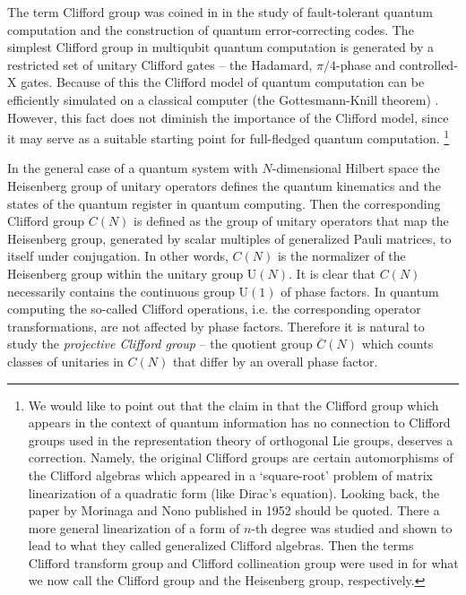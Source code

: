 \documentclass[10pt]{amsart}
\theoremstyle{plain}
\theoremstyle{definition}
\theoremstyle{remark}%
\newcommand{\U}{\mathrm{U}}
\begin{document}
The term Clifford group was coined in \cite{Gottesman} in the study 
of fault-tolerant quantum computation and the construction 
of quantum error-correcting codes. 
The simplest Clifford group in multiqubit quantum computation is generated 
by a restricted set of unitary Clifford gates -- 
the Hadamard, $\pi/4$-phase and controlled-X gates. 
Because of this the Clifford model of quantum computation 
can be efficiently simulated on a classical computer 
(the Gottesmann-Knill theorem) \cite{NielsenChuang}.
However, this fact does not diminish the importance of the Clifford
model, since it may serve as a suitable starting point for 
full-fledged quantum computation.
\footnote{We would like to point out that the claim in 
	\cite[note 43]{Gross} that the Clifford group 
which appears in the context of quantum information has no connection to 
Clifford groups used in the representation theory of orthogonal Lie groups, 
deserves a correction. Namely, the original Clifford
groups are certain automorphisms of the Clifford algebras
which appeared in a `square-root' problem of matrix linearization 
of a quadratic form  (like Dirac's equation). 
Looking back, the paper by Morinaga and Nono published in 1952
\cite{MorinagaNono} should be quoted.
There a more general linearization of a form of $n$-th degree was 
studied and shown to lead to what they called generalized Clifford algebras.
Then the terms Clifford transform group and Clifford collineation group 
were used in \cite{bolt1,bolt2} for what we now call
the Clifford group and the Heisenberg group, respectively.
}


In the general case of a quantum system with
$N$-dimensional Hilbert space the Heisenberg group of
unitary operators defines the quantum kinematics and the states of
the quantum register in quantum computing. 
Then the corresponding Clifford group $C(N)$ is defined as the group 
of unitary operators that map  the Heisenberg group, generated by scalar multiples of 
generalized Pauli matrices, to itself under conjugation.
 In other words, $C(N)$ is the normalizer of the Heisenberg group within the unitary group $\U(N)$.
It is clear that $C(N)$  necessarily contains
the continuous group $\U(1)$ of phase factors.
In quantum computing the so-called Clifford operations, i.e.
the corresponding operator transformations, are not affected
by phase factors. Therefore it is natural to study the 
\textit{projective Clifford group} -- the quotient group 
$\overline{C}(N)$ which counts classes of unitaries
in $C(N)$ that differ by an overall phase factor.
\end{document}
